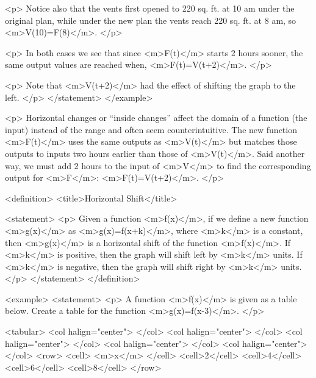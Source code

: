                 <p>
                    Notice also that the vents first opened to 220 sq.
                    ft.
                    at 10 am under the original plan, while under the new plan the vents reach 220 sq.
                    ft.
                    at 8 am, so <m>V(10)=F(8)</m>.
                </p>

                <p>
                    In both cases we see that since <m>F(t)</m> starts 2 hours sooner, the same output values are reached when, <m>F(t)=V(t+2)</m>.
                </p>

                <p>
                    Note that <m>V(t+2)</m> had the effect of shifting the graph to the left.
                </p>
            </statement>
        </example>

        <p>
            Horizontal changes or “inside changes” affect the domain of a function (the input) instead of the range and often seem counterintuitive.
            The new function <m>F(t)</m> uses the same outputs as <m>V(t)</m> but matches those outputs to inputs two hours earlier than those of <m>V(t)</m>.
            Said another way, we must add 2 hours to the input of <m>V</m> to find the corresponding output for <m>F</m>: <m>F(t)=V(t+2)</m>.
        </p>

        <definition>
            <title>Horizontal Shift</title>

            <statement>
                <p>
                    Given a function <m>f(x)</m>, if we define a new function <m>g(x)</m> as <m>g(x)=f(x+k)</m>, where <m>k</m> is a constant, then <m>g(x)</m> is a horizontal shift of the function <m>f(x)</m>.
                    If <m>k</m> is positive, then the graph will shift left by <m>k</m> units.
                    If <m>k</m> is negative, then the graph will shift right by <m>k</m> units.
                </p>
            </statement>
        </definition>

        <example>
            <statement>
                <p>
                    A function <m>f(x)</m> is given as a table below.
                    Create a table for the function <m>g(x)=f(x-3)</m>.
                </p>

                <tabular>
                    <col halign="center"> </col> <col halign="center"> </col> <col halign="center"> </col> <col halign="center"> </col> <col halign="center"> </col>
                    <row>
                        <cell> <m>x</m> </cell>
                        <cell>2</cell>
                        <cell>4</cell>
                        <cell>6</cell>
                        <cell>8</cell>
                    </row>

